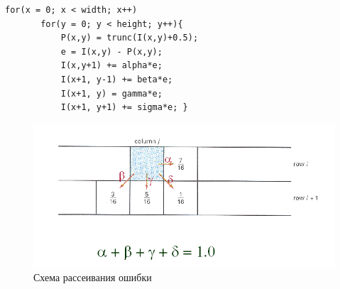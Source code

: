    \begin{lstlisting}[style=pseudocode,caption={Алгоритм Флойда-Стейнберга}]
   for(x = 0; x < width; x++)
       for(y = 0; y < height; y++){
           P(x,y) = trunc(I(x,y)+0.5);
           e = I(x,y) - P(x,y);
           I(x,y+1) += alpha*e;
           I(x+1, y-1) += beta*e;
           I(x+1, y) = gamma*e;
           I(x+1, y+1) += sigma*e; }
   \end{lstlisting}
    \begin{figure}
    	\centering
    	\includegraphics[width=\textwidth]{img/1.png}
    	\caption{Схема рассеивания ошибки}
    	\label{fig:spire03}
    \end{figure}


